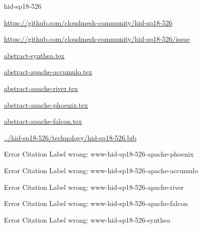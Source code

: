 \begin{IU}

hid-sp18-526

\url{https://github.com/cloudmesh-community/hid-sp18-526}

\url{https://github.com/cloudmesh-community/hid-sp18-526/issue}

\href{https://github.com/cloudmesh-community/hid-sp18-526/blob/master//technology/abstract-synthea.tex}{abstract-synthea.tex}

\href{https://github.com/cloudmesh-community/hid-sp18-526/blob/master//technology/abstract-apache-accumulo.tex}{abstract-apache-accumulo.tex}

\href{https://github.com/cloudmesh-community/hid-sp18-526/blob/master//technology/abstract-apache-river.tex}{abstract-apache-river.tex}

\href{https://github.com/cloudmesh-community/hid-sp18-526/blob/master//technology/abstract-apache-phoenix.tex}{abstract-apache-phoenix.tex}

\href{https://github.com/cloudmesh-community/hid-sp18-526/blob/master//technology/abstract-apache-falcon.tex}{abstract-apache-falcon.tex}

\href{https://github.com/cloudmesh-community/hid-sp18-526/blob/master//technology/hid-sp18-526.bib}{../hid-sp18-526/technology/hid-sp18-526.bib}

 Error Citation Label wrong: www-hid-sp18-526-apache-phoenix

 Error Citation Label wrong: www-hid-sp18-526-apache-accumulo

 Error Citation Label wrong: www-hid-sp18-526-apache-river

 Error Citation Label wrong: www-hid-sp18-526-apache-falcon

 Error Citation Label wrong: www-hid-sp18-526-synthea

\end{IU}


